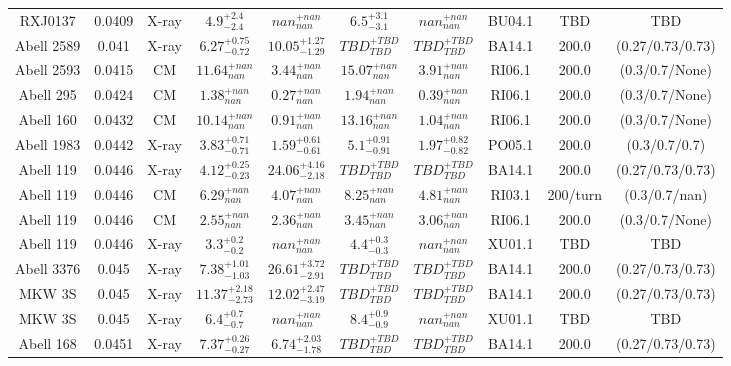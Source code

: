 \begin{table}
\begin{tabular}{cccccccccc}
RXJ0137 & 0.0409 & X-ray & ${4.9}^{+2.4}_{-2.4}$ & ${nan}^{+nan}_{nan}$ & ${6.5}^{+3.1}_{-3.1}$ & ${nan}^{+nan}_{nan}$ & BU04.1 & TBD & TBD \\
Abell 2589 & 0.041 & X-ray & ${6.27}^{+0.75}_{-0.72}$ & ${10.05}^{+1.27}_{-1.29}$ & ${TBD}^{+TBD}_{TBD}$ & ${TBD}^{+TBD}_{TBD}$ & BA14.1 & 200.0 & (0.27/0.73/0.73) \\
Abell 2593 & 0.0415 & CM & ${11.64}^{+nan}_{nan}$ & ${3.44}^{+nan}_{nan}$ & ${15.07}^{+nan}_{nan}$ & ${3.91}^{+nan}_{nan}$ & RI06.1 & 200.0 & (0.3/0.7/None) \\
Abell 295 & 0.0424 & CM & ${1.38}^{+nan}_{nan}$ & ${0.27}^{+nan}_{nan}$ & ${1.94}^{+nan}_{nan}$ & ${0.39}^{+nan}_{nan}$ & RI06.1 & 200.0 & (0.3/0.7/None) \\
Abell 160 & 0.0432 & CM & ${10.14}^{+nan}_{nan}$ & ${0.91}^{+nan}_{nan}$ & ${13.16}^{+nan}_{nan}$ & ${1.04}^{+nan}_{nan}$ & RI06.1 & 200.0 & (0.3/0.7/None) \\
Abell 1983 & 0.0442 & X-ray & ${3.83}^{+0.71}_{-0.71}$ & ${1.59}^{+0.61}_{-0.61}$ & ${5.1}^{+0.91}_{-0.91}$ & ${1.97}^{+0.82}_{-0.82}$ & PO05.1 & 200.0 & (0.3/0.7/0.7) \\
Abell 119 & 0.0446 & X-ray & ${4.12}^{+0.25}_{-0.23}$ & ${24.06}^{+4.16}_{-2.18}$ & ${TBD}^{+TBD}_{TBD}$ & ${TBD}^{+TBD}_{TBD}$ & BA14.1 & 200.0 & (0.27/0.73/0.73) \\
Abell 119 & 0.0446 & CM & ${6.29}^{+nan}_{nan}$ & ${4.07}^{+nan}_{nan}$ & ${8.25}^{+nan}_{nan}$ & ${4.81}^{+nan}_{nan}$ & RI03.1 & 200/turn & (0.3/0.7/nan) \\
Abell 119 & 0.0446 & CM & ${2.55}^{+nan}_{nan}$ & ${2.36}^{+nan}_{nan}$ & ${3.45}^{+nan}_{nan}$ & ${3.06}^{+nan}_{nan}$ & RI06.1 & 200.0 & (0.3/0.7/None) \\
Abell 119 & 0.0446 & X-ray & ${3.3}^{+0.2}_{-0.2}$ & ${nan}^{+nan}_{nan}$ & ${4.4}^{+0.3}_{-0.3}$ & ${nan}^{+nan}_{nan}$ & XU01.1 & TBD & TBD \\
Abell 3376 & 0.045 & X-ray & ${7.38}^{+1.01}_{-1.03}$ & ${26.61}^{+3.72}_{-2.91}$ & ${TBD}^{+TBD}_{TBD}$ & ${TBD}^{+TBD}_{TBD}$ & BA14.1 & 200.0 & (0.27/0.73/0.73) \\
MKW 3S & 0.045 & X-ray & ${11.37}^{+2.18}_{-2.73}$ & ${12.02}^{+2.47}_{-3.19}$ & ${TBD}^{+TBD}_{TBD}$ & ${TBD}^{+TBD}_{TBD}$ & BA14.1 & 200.0 & (0.27/0.73/0.73) \\
MKW 3S & 0.045 & X-ray & ${6.4}^{+0.7}_{-0.7}$ & ${nan}^{+nan}_{nan}$ & ${8.4}^{+0.9}_{-0.9}$ & ${nan}^{+nan}_{nan}$ & XU01.1 & TBD & TBD \\
Abell 168 & 0.0451 & X-ray & ${7.37}^{+0.26}_{-0.27}$ & ${6.74}^{+2.03}_{-1.78}$ & ${TBD}^{+TBD}_{TBD}$ & ${TBD}^{+TBD}_{TBD}$ & BA14.1 & 200.0 & (0.27/0.73/0.73) \\

\end{tabular}
\end{table}
